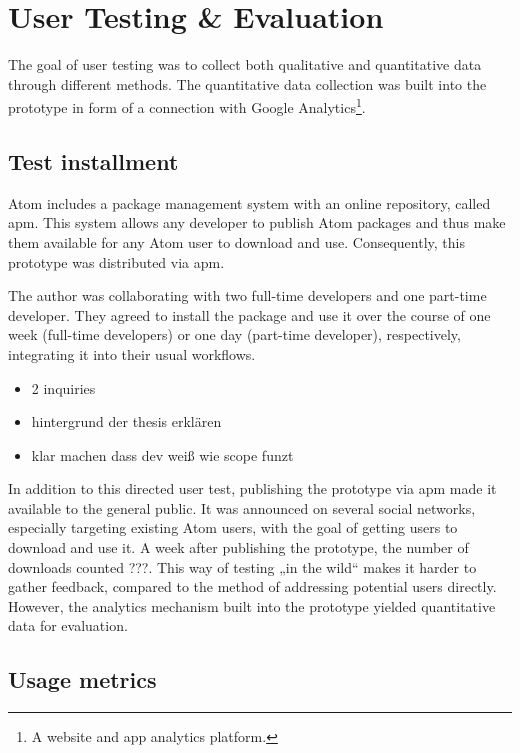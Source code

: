 \section{User Testing \& Evaluation}\label{user-testing-evaluation}

The goal of user testing was to collect both qualitative and
quantitative data through different methods. The quantitative data
collection was built into the prototype in form of a connection with
Google Analytics\footnote{A website and app analytics platform.}.

\subsection{Test installment}\label{test-installment}

Atom includes a package management system with an online repository,
called \ac{apm}. This system allows any developer to publish Atom
packages and thus make them available for any Atom user to download and
use. Consequently, this prototype was distributed via \ac{apm}.

The author was collaborating with two full-time developers and one
part-time developer. They agreed to install the package and use it over
the course of one week (full-time developers) or one day (part-time
developer), respectively, integrating it into their usual workflows.

\begin{itemize}
\itemsep1pt\parskip0pt
\item
  2 inquiries
\item
  hintergrund der thesis erklären
\item
  klar machen dass dev weiß wie scope funzt
\end{itemize}

In addition to this directed user test, publishing the prototype via
\ac{apm} made it available to the general public. It was announced on
several social networks, especially targeting existing Atom users, with
the goal of getting users to download and use it. A week after
publishing the prototype, the number of downloads counted ???. This way
of testing „in the wild“ makes it harder to gather feedback, compared to
the method of addressing potential users directly. However, the
analytics mechanism built into the prototype yielded quantitative data
for evaluation.

\subsection{Usage metrics}\label{usage-metrics}

